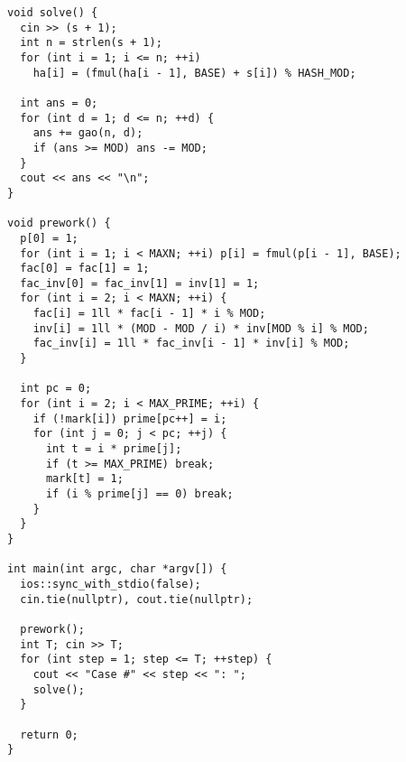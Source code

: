\begin{lstlisting}
void solve() {
  cin >> (s + 1);
  int n = strlen(s + 1);
  for (int i = 1; i <= n; ++i)
    ha[i] = (fmul(ha[i - 1], BASE) + s[i]) % HASH_MOD;

  int ans = 0;
  for (int d = 1; d <= n; ++d) {
    ans += gao(n, d);
    if (ans >= MOD) ans -= MOD;
  }
  cout << ans << "\n";
}

void prework() {
  p[0] = 1;
  for (int i = 1; i < MAXN; ++i) p[i] = fmul(p[i - 1], BASE);
  fac[0] = fac[1] = 1;
  fac_inv[0] = fac_inv[1] = inv[1] = 1;
  for (int i = 2; i < MAXN; ++i) {
    fac[i] = 1ll * fac[i - 1] * i % MOD;
    inv[i] = 1ll * (MOD - MOD / i) * inv[MOD % i] % MOD;
    fac_inv[i] = 1ll * fac_inv[i - 1] * inv[i] % MOD;
  }

  int pc = 0;
  for (int i = 2; i < MAX_PRIME; ++i) {
    if (!mark[i]) prime[pc++] = i;
    for (int j = 0; j < pc; ++j) {
      int t = i * prime[j];
      if (t >= MAX_PRIME) break;
      mark[t] = 1;
      if (i % prime[j] == 0) break;
    }
  }
}

int main(int argc, char *argv[]) {
  ios::sync_with_stdio(false);
  cin.tie(nullptr), cout.tie(nullptr);

  prework();
  int T; cin >> T;
  for (int step = 1; step <= T; ++step) {
    cout << "Case #" << step << ": ";
    solve();
  }

  return 0;
}

\end{lstlisting}
